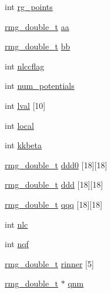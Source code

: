 \begin{DoxyCompactItemize}
\item 
int \hyperlink{struct_s_p_e_c_i_e_s_a9998e10441c80b6287081f79e4d2637f}{rg\-\_\-points}
\item 
\hyperlink{rmgtypes_8h_aaa16921c14f121c56eaa42390a340db8}{rmg\-\_\-double\-\_\-t} \hyperlink{struct_s_p_e_c_i_e_s_a327b3bfbfd30ddb525442d20213e7bf7}{aa}
\item 
\hyperlink{rmgtypes_8h_aaa16921c14f121c56eaa42390a340db8}{rmg\-\_\-double\-\_\-t} \hyperlink{struct_s_p_e_c_i_e_s_a0d0f59754dd2ca7dbac1219a7b36d076}{bb}
\item 
int \hyperlink{struct_s_p_e_c_i_e_s_a10983aa592468a5ccb1954071a0f3155}{nlccflag}
\item 
int \hyperlink{struct_s_p_e_c_i_e_s_a7325a6fe47e5bc07810b8e495b97995e}{num\-\_\-potentials}
\item 
int \hyperlink{struct_s_p_e_c_i_e_s_a7894b6912514e8c36280a0f4ab23829c}{lval} \mbox{[}10\mbox{]}
\item 
int \hyperlink{struct_s_p_e_c_i_e_s_a854450af563396c94c0523643118f4a8}{local}
\item 
int \hyperlink{struct_s_p_e_c_i_e_s_a9214c7257961e1414cdb81e5edd9ac4d}{kkbeta}
\item 
\hyperlink{rmgtypes_8h_aaa16921c14f121c56eaa42390a340db8}{rmg\-\_\-double\-\_\-t} \hyperlink{struct_s_p_e_c_i_e_s_affa211ba8f13d635a59bd2ae5e1618c0}{ddd0} \mbox{[}18\mbox{]}\mbox{[}18\mbox{]}
\item 
\hyperlink{rmgtypes_8h_aaa16921c14f121c56eaa42390a340db8}{rmg\-\_\-double\-\_\-t} \hyperlink{struct_s_p_e_c_i_e_s_a186cd53d2200f4227f9709ec6eb25e23}{ddd} \mbox{[}18\mbox{]}\mbox{[}18\mbox{]}
\item 
\hyperlink{rmgtypes_8h_aaa16921c14f121c56eaa42390a340db8}{rmg\-\_\-double\-\_\-t} \hyperlink{struct_s_p_e_c_i_e_s_a062703a152e5b43ef55b7b098a9c32b6}{qqq} \mbox{[}18\mbox{]}\mbox{[}18\mbox{]}
\item 
int \hyperlink{struct_s_p_e_c_i_e_s_a39120d6b481dcbe307f8a6dfabf94abe}{nlc}
\item 
int \hyperlink{struct_s_p_e_c_i_e_s_a2ca22beefd9d7be71da9178b8d3a1fef}{nqf}
\item 
\hyperlink{rmgtypes_8h_aaa16921c14f121c56eaa42390a340db8}{rmg\-\_\-double\-\_\-t} \hyperlink{struct_s_p_e_c_i_e_s_a1c9a2d9b07a12723655a508325e291b5}{rinner} \mbox{[}5\mbox{]}
\item 
\hyperlink{rmgtypes_8h_aaa16921c14f121c56eaa42390a340db8}{rmg\-\_\-double\-\_\-t} $\ast$ \hyperlink{struct_s_p_e_c_i_e_s_a04863d59e8307c0af2bc72908a061b1c}{qnm}
\item 

\end{DoxyCompactItemize}
